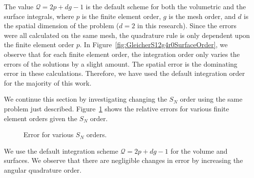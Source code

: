 \documentclass[12pt,letterpaper]{article}
\begin{document}
%
The value $\mathcal{Q}=2p+dg-1$ is the default scheme for both the volumetric and the surface integrals, where $p$ is the finite element order, $g$ is the mesh order, and $d$ is the spatial dimension of the problem ($d=2$ in this research). Since the errors were all calculated on the same mesh, the quadrature rule is only dependent upon the finite element order $p$. In Figure~\ref{fig:GleicherS12g4r0SurfaceOrder}, we observe that for each finite element order, the integration order only varies the errors of the solutions by a slight amount. The spatial error is the dominating error in these calculations. Therefore, we have used the default integration order for the majority of this work.

We continue this section by investigating changing the $S_N$ order using the same problem just described. Figure~\ref{fig:Gleicherg4r0AngularQuadrature} shows the relative errors for various finite element orders given the $S_N$ order.
%
\begin{figure}[!htb]
\centering
{}
\caption{Error for various $S_N$ orders.}
\label{fig:Gleicherg4r0AngularQuadrature}
\end{figure}
%
We use the default integration scheme $\mathcal{Q}=2p+dg-1$ for the volume and surfaces. We observe that there are negligible changes in error by increasing the angular quadrature order.
\end{document}
